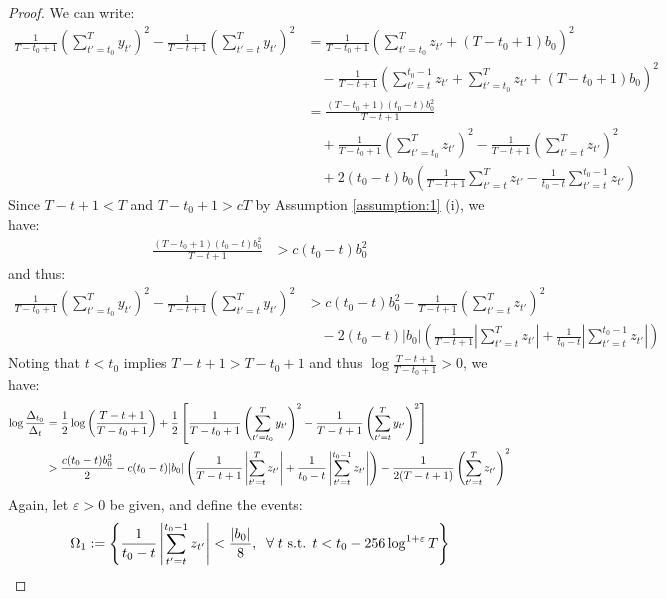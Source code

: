 \begin{proof}
We can write:
\small
\begin{align*}
    \frac{1}{T-t_0+1}\left(\sum_{t'=t_0}^{T} y_{t'}\right)^2 - \frac{1}{T-t+1}\left(\sum_{t'=t}^{T} y_{t'}\right)^2 &= \frac{1}{T-t_0+1}\left(\sum_{t'=t_0}^{T} z_{t'} + (T-t_0+1)b_0\right)^2 \\
    &\quad - \frac{1}{T-t+1}\left(\sum_{t'=t}^{t_0-1} z_{t'} + \sum_{t'=t_0}^{T} z_{t'} + (T-t_0+1)b_0\right)^2 \\ 
    &= \frac{(T-t_0+1)(t_0 - t) b_0^2}{T-t+1} \\
    &\quad + \frac{1}{T-t_0+1}\left(\sum_{t'=t_0}^{T} z_{t'}\right)^2 -\frac{1}{T-t+1}\left(\sum_{t'=t}^{T} z_{t'}\right)^2\\
    &\quad  + 2(t_0 - t) b_0\left(\frac{1}{T-t+1}\sum_{t'=t}^{T} z_{t'} - \frac{1}{t_0-t}\sum_{t'=t}^{t_0-1} z_{t'}\right)
\end{align*}
\normalsize
Since $T-t+1 < T$ and $T - t_0 + 1 > cT$ by Assumption \ref{assumption:1} (i), we have:
\begin{align*}
    \frac{(T - t_0 + 1)(t_0-t)b_0^2}{T-t+1} &> c (t_0-t) b_0^2 
\end{align*}
and thus:
\begin{align*}
    \frac{1}{T-t_0+1}\left(\sum_{t'=t_0}^{T} y_{t'}\right)^2 - \frac{1}{T-t+1}\left(\sum_{t'=t}^{T} y_{t'}\right)^2 &> c(t_0 - t)b_0^2 -\frac{1}{T-t+1}\left(\sum_{t'=t}^{T} z_{t'}\right)^2\\
    &\quad  - 2(t_0 - t) |b_0|\left(\frac{1}{T-t+1}\left|\sum_{t'=t}^{T} z_{t'}\right| + \frac{1}{t_0-t}\left|\sum_{t'=t}^{t_0-1} z_{t'}\right|\right)
\end{align*}
Noting that $t < t_0$ implies $T - t + 1 > T - t_0 + 1$ and thus $ \log \frac{T-t+1}{T-t_0+1} > 0$, we have:
\small
\begin{align}
    \log \frac{\Delta_{t_0}}{\Delta_t} &= \frac{1}{2} \log \left(\frac{T-t+1}{T-t_0+1}\right) + \frac{1}{2} \left[\frac{1}{T-t_0+1}\left(\sum_{t'=t_0}^{T} y_{t'}\right)^2- \frac{1}{T-t+1}\left(\sum_{t'=t}^{T} y_{t'}\right)^2\right] \notag \\
    &> \frac{c (t_0-t)b_0^2 }{2} - c(t_0 -t) |b_0| \left(\frac{1}{T-t+1}\left|\sum_{t'=t}^{T} z_{t'}\right| + \frac{1}{t_0-t}\left|\sum_{t'=t}^{t_0-1} z_{t'}\right|\right) -\frac{1}{2(T-t+1)}\left(\sum_{t'=t}^{T} z_{t'}\right)^2 \label{eq:thm1-cs2-bd}
\end{align}
\normalsize
Again, let $\varepsilon > 0$ be given, and define the events: 
\begin{align*}
    \Omega_1 &:= \left\{\frac{1}{t_0-t}\left|\sum_{t'=t}^{t_0-1} z_{t'}\right| < \frac{|b_0|}{8}, \; \sforall t \text{ s.t. } t < t_0 - 256 \log^{1+\varepsilon}T\right\} \\

\end{align*}
\end{proof}
